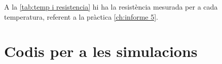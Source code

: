A la \cref{tab:temp i resistencia} hi ha la resistència mesurada per a cada temperatura, referent a la pràctica \ref{ch:informe 5}.

\newpage
\section{Codis per a les simulacions}\label{sec:codis}





